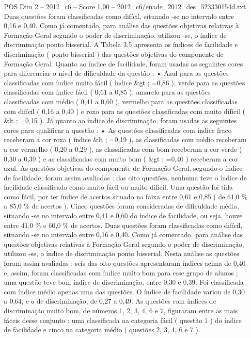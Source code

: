 \begin{textsample}{POS Dim 2 – 2012\_c6 – Score 1.00 – 2012\_c6/enade\_2012\_des\_523330154d.txt}
Duas questões foram classificadas como difícil, situando -se no intervalo entre 0,16 e 0,40.
Como já comentado, para análise das questões objetivas relativas à Formação Geral segundo o poder de discriminação, utilizou -se, o índice de discriminação ponto bisserial.
A Tabela 3.5 apresenta os índices de facilidade e discriminação ( ponto bisserial ) das questões objetivas do componente de Formação Geral.
Quanto ao índice de facilidade, foram usadas as seguintes cores para diferenciar o nível de dificuldade da questão : • Azul para as questões classificadas com índice muito fácil ( índice \&gt ; =0,86 ), verde para as questões classificadas com índice fácil ( 0,61 a 0,85 ), amarelo para as questões classificadas com médio ( 0,41 a 0,60 ), vermelho para as questões classificadas com difícil ( 0,16 a 0,40 ) e roxo para as questões classificadas com muito difícil ( \&lt ; =0,15 ).
Já quanto ao índice de discriminação, foram usadas as seguintes cores para qualificar a questão : • As questões classificadas com índice fraco receberam a cor roxa ( índice \&lt ; =0,19 ), as classificadas com médio receberam a cor vermelho ( 0,20 a 0,29 ), as classificadas com bom receberam a cor verde ( 0,30 a 0,39 ) e as classificadas com muito bom ( \&gt ; =0,40 ) receberam a cor azul.
As questões objetivas do componente de Formação Geral, segundo o índice de facilidade, foram assim avaliadas : das oito questões, nenhuma teve o índice de facilidade classificado como muito fácil ou muito difícil.
Uma questão foi tida como fácil, por ter índice de acertos situado na faixa entre 0,61 e 0,85 ( de 61,0 \% a 85,0 \% de acertos ).
Cinco questões foram consideradas de dificuldade média, situando -se no intervalo entre 0,41 e 0,60 do índice de facilidade, ou seja, houve entre 41,0 \% e 60,0 \% de acertos.
Duas questões foram classificadas como difícil, situando -se no intervalo entre 0,16 e 0,40.
Como já comentado, para análise das questões objetivas relativas à Formação Geral segundo o poder de discriminação, utilizou -se, o índice de discriminação ponto bisserial.
Nesta análise as questões foram assim avaliadas : seis das oito questões apresentaram índices acima de 0,40 e, assim, foram classificadas com índice muito bom para esse grupo de alunos ; uma questão teve bom índice de discriminação, entre 0,30 e 0,39.
Foi classificada com índice médio apenas uma das questões.
O índice de facilidade variou de 0,30 a 0,64, e o de discriminação, de 0,27 a 0,49.
As questões com índices de discriminação muito bom, de números 1, 2, 3, 4, 6 e 7, figuraram entre as mais fáceis desse conjunto : uma classificada na categoria fácil ( questão 1 ) do índice de facilidade e cinco na categoria médio ( questões 2, 3, 4, 6 e 7 ).

\end{textsample}
